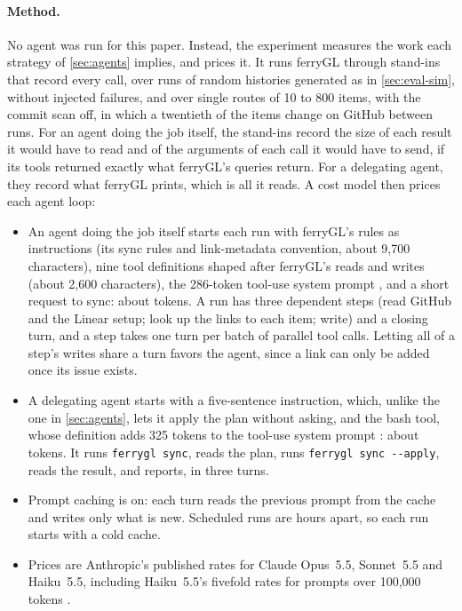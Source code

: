 \documentclass[11pt,a4paper]{article}
\newcommand{\ferry}{ferryGL}
\newcommand{\code}[1]{\texttt{#1}}
\newcommand{\opt}[1]{\texttt{-{}-#1}}
\begin{document}
\paragraph{Method.} No agent was run for this paper. Instead, the experiment measures the work
each strategy of \cref{sec:agents} implies, and prices it. It runs \ferry{} through stand-ins
that record every call, over \AgentRuns{} runs of random histories generated as in
\cref{sec:eval-sim}, without injected failures, and over single routes of 10 to 800 items, with
the commit scan off, in which a twentieth of the items change on GitHub between runs. For an agent
doing the job itself, the stand-ins record the size of each result it would have to read and of
the arguments of each call it would have to send, if its tools returned exactly what \ferry's
queries return. For a delegating agent, they record what \ferry{} prints, which is all it reads.
A cost model then prices each agent loop:
\begin{itemize}
  \item An agent doing the job itself starts each run with \ferry's rules as instructions (its
    sync rules and link-metadata convention, about 9,700 characters), nine tool definitions
    shaped after \ferry's reads and writes (about 2,600 characters), the 286-token tool-use
    system prompt \cite{anthropic2026pricing}, and a short request to sync: about
    \AgentFixedLean{} tokens. A run has three dependent steps (read GitHub and the Linear setup;
    look up the links to each item; write) and a closing turn, and a step takes one turn per
    batch of parallel tool calls. Letting all of a step's writes share a turn favors the agent,
    since a link can only be added once its issue exists.
  \item A delegating agent starts with a five-sentence instruction, which, unlike the one in
    \cref{sec:agents}, lets it apply the plan without asking, and the bash tool, whose
    definition adds 325 tokens to the tool-use system prompt \cite{anthropic2026pricing}: about
    \AgentFixedLeanDelegating{} tokens. It runs \code{ferrygl sync}, reads the plan, runs
    \code{ferrygl sync \opt{apply}}, reads the result, and reports, in three turns.
  \item Prompt caching is on: each turn reads the previous prompt from the cache and writes only
    what is new. Scheduled runs are hours apart, so each run starts with a cold cache.
  \item Prices are Anthropic's published rates for Claude Opus~5.5, Sonnet~5.5 and Haiku~5.5,
    including Haiku~5.5's fivefold rates for prompts over 100,000 tokens
    \cite{anthropic2026pricing}.
\end{itemize}
\end{document}

